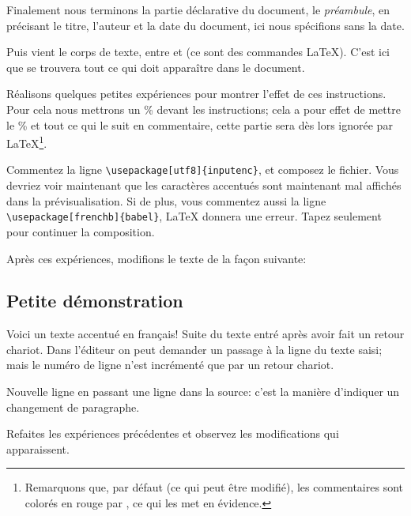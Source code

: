 Finalement nous terminons la partie déclarative du document, le \emph{préambule}, en précisant le titre, l'auteur et la date du document, ici nous spécifions sans la date.

Puis vient le corps de texte, entre \verb++ et \verb++ (ce sont des commandes \LaTeX). C'est ici que se trouvera tout ce qui doit apparaître dans le document.

Réalisons quelques petites expériences pour montrer l'effet de ces instructions. Pour cela nous mettrons un \% devant les instructions; cela a pour effet de mettre le \% et tout ce qui le suit en commentaire, cette partie sera dès lors ignorée par \LaTeX \footnote{Remarquons que, par défaut (ce qui peut être modifié), les commentaires sont colorés en rouge par \Tw, ce qui les met en évidence.}.

Commentez la ligne \verb|\usepackage[utf8]{inputenc}|, et composez le fichier. Vous devriez voir maintenant que les caractères accentués sont maintenant mal affichés dans la prévisualisation. Si de plus, vous commentez aussi la ligne \verb|\usepackage[frenchb]{babel}|, {\LaTeX} donnera une erreur. Tapez seulement \Return pour continuer la composition.

Après ces expériences, modifions le texte de la façon suivante:
\begin{example}

\maketitle
\tableofcontents

\section{Petite démonstration}

Voici un texte accentué en français!
Suite du texte entré après avoir fait un retour chariot. Dans 
l'éditeur on peut demander un passage à la ligne 
du texte saisi; mais le numéro de ligne n'est incrémenté que par un
retour chariot.

Nouvelle ligne en passant une ligne dans la source: c'est la manière 
d'indiquer un changement de paragraphe.


\end{example}
Refaites les expériences précédentes et observez les modifications qui apparaissent.

